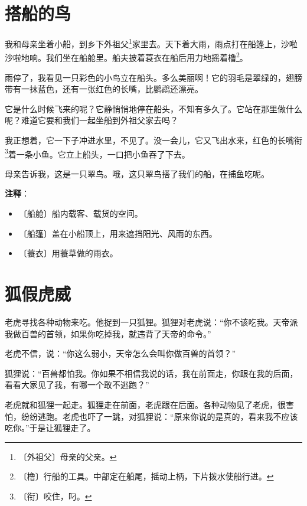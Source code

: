 \documentclass[12pt,UTF-8,openany]{ctexbook}
\begin{document}
\chapter{搭船的鸟}

\begin{large}
    
    我和母亲坐着小船，到乡下外祖父\footnote{〔外祖父〕母亲的父亲。}家里去。天下着大雨，雨点打在船篷上，沙啦沙啦地响。我们坐在船舱里。船夫披着蓑衣在船后用力地摇着橹\footnote{〔橹〕行船的工具。中部定在船尾，摇动上柄，下片拨水使船行进。}。
    
    雨停了，我看见一只彩色的小鸟立在船头。多么美丽啊！它的羽毛是翠绿的，翅膀带有一抹蓝色，还有一张红色的长嘴，比鹦鹉还漂亮。
    
    它是什么时候飞来的呢？它静悄悄地停在船头，不知有多久了。它站在那里做什么呢？难道它要和我们一起坐船到外祖父家去吗？
    
    我正想着，它一下子冲进水里，不见了。没一会儿，它又飞出水来，红色的长嘴衔\footnote{〔衔〕咬住，叼。}着一条小鱼。它立上船头，一口把小鱼吞了下去。
    
    母亲告诉我，这是一只翠鸟。哦，这只翠鸟搭了我们的船，在捕鱼吃呢。
    
\end{large}


\newpage

\textbf{注释}：

\vspace{-1em}

\begin{itemize}
    \setlength\itemsep{-0.2em}
    \item 〔船舱〕船内载客、载货的空间。
    \item 〔船篷〕盖在小船顶上，用来遮挡阳光、风雨的东西。
    \item 〔蓑衣〕用蓑草做的雨衣。
\end{itemize}

\chapter{狐假虎威}

\begin{large}
    
    老虎寻找各种动物来吃。他捉到一只狐狸。狐狸对老虎说：“你不该吃我。天帝派我做百兽的首领，如果你吃掉我，就违背了天帝的命令。”
    
    老虎不信，说：“你这么弱小，天帝怎么会叫你做百兽的首领？”
    
    狐狸说：“百兽都怕我。你如果不相信我说的话，我在前面走，你跟在我的后面，看看大家见了我，有哪一个敢不逃跑？”
    
    老虎就和狐狸一起走。狐狸走在前面，老虎跟在后面。各种动物见了老虎，很害怕，纷纷逃跑。老虎也吓了一跳，对狐狸说：“原来你说的是真的，看来我不应该吃你。”于是让狐狸走了。
    
\end{large}
\end{document}

